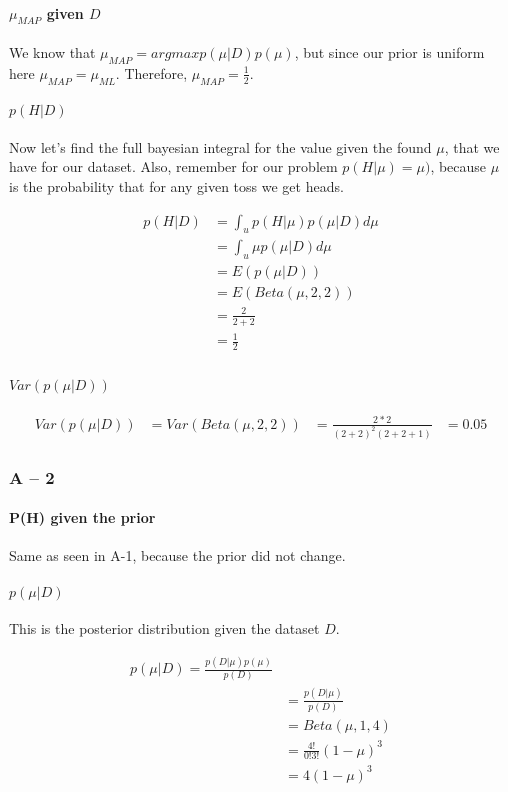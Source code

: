 \documentclass[paper=a4, fontsize=11pt]{scrartcl} %
\begin{document}
\paragraph{$\mu_{MAP}$ given $D$}
We know that $\mu_{MAP} = argmax p(\mu|D)p(\mu)$, but since our prior is uniform here $\mu_{MAP} = \mu_{ML}$.  Therefore, $\mu_{MAP} = \frac{1}{2}$.

\paragraph{$p(H|D)$}
Now let's find the full bayesian integral for the value given the found $\mu$, that we have for our dataset.  Also, remember for our problem $p(H|\mu) = \mu)$, because $\mu$ is the probability that for any given toss we get heads.

\begin{align}
p(H|D) &= \int_u p(H|\mu)p(\mu|D)d\mu \\
&= \int_u \mu p(\mu|D)d\mu \\
&= E( p(\mu|D)) \\
&= E( Beta(\mu,2,2)) \\
&= \frac{2}{2+2} \\
&= \frac{1}{2} \\
\end{align}

\paragraph{$Var(p(\mu|D))$}

\begin{align}
Var(p(\mu|D)) &=  Var(Beta(\mu,2,2))
&= \frac{2*2}{(2+2)^2(2+2+1)}
&= 0.05
\end{align}

\subsubsection{A -- 2}
\paragraph{P(H) given the prior}
Same as seen in A-1, because the prior did not change.

\paragraph{$p(\mu|D)$}
This is the posterior distribution given the dataset $D$. 

\begin{align}
p(\mu|D) = \frac{p(D|\mu)p(\mu)}{p(D)} \\
&= \frac{p(D|\mu)}{p(D)} \\
&= Beta(\mu,1,4) \\
&= \frac{4!}{0!3!}(1-\mu)^3 \\
& = 4 (1-\mu)^3
\end{align}
\end{document}
